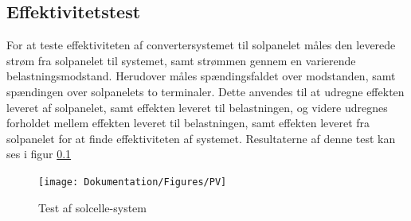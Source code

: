 \documentclass[../main.tex]{subfiles}
\begin{document}
\subsection{Effektivitetstest}
For at teste effektiviteten af convertersystemet til solpanelet måles den leverede strøm fra solpanelet til systemet, samt strømmen gennem en varierende belastningsmodstand. Herudover måles spændingsfaldet over modstanden, samt spændingen over solpanelets to terminaler. Dette anvendes til at udregne effekten leveret af solpanelet, samt effekten leveret til belastningen, og videre udregnes forholdet mellem effekten leveret til belastningen, samt effekten leveret fra solpanelet 
for at finde effektiviteten af systemet. Resultaterne af denne test kan ses i figur \ref{}    
    \begin{figure}[H]
        \texttt{[image: Dokumentation/Figures/PV]}
        \caption{Test af solcelle-system}
        \label{fig: Test af solcelle-system}
        \end{figure}

        
\end{document}
